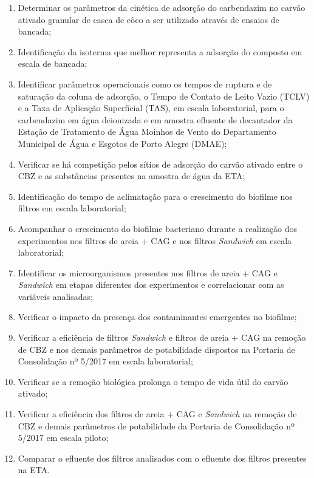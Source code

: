 \documentclass[
]{article}
\providecommand{\tightlist}{%
  \setlength{\itemsep}{0pt}\setlength{\parskip}{0pt}}
\begin{document}
\begin{enumerate}
\def\labelenumi{\alph{enumi})}
\tightlist
\item
  Determinar os parâmetros da cinética de adsorção do carbendazim no
  carvão ativado granular de casca de côco a ser utilizado através de
  ensaios de bancada;
\item
  Identificação da isoterma que melhor representa a adsorção do composto
  em escala de bancada;
\item
  Identificar parâmetros operacionais como os tempos de ruptura e de
  saturação da coluna de adsorção, o Tempo de Contato de Leito Vazio
  (TCLV) e a Taxa de Aplicação Superficial (TAS), em escala
  laboratorial, para o carbendazim em água deionizada e em amostra
  efluente de decantador da Estação de Tratamento de Água Moinhos de
  Vento do Departamento Municipal de Água e Esgotos de Porto Alegre
  (DMAE);
\item
  Verificar se há competição pelos sítios de adsorção do carvão ativado
  entre o CBZ e as substâncias presentes na amostra de água da ETA;
\item
  Identificação do tempo de aclimatação para o crescimento do biofilme
  nos filtros em escala laboratorial;
\item
  Acompanhar o crescimento do biofilme bacteriano durante a realização
  dos experimentos nos filtros de areia + CAG e nos filtros
  \emph{Sandwich} em escala laboratorial;
\item
  Identificar os microorganismos presentes nos filtros de areia + CAG e
  \emph{Sandwich} em etapas diferentes dos experimentos e correlacionar
  com as variáveis analisadas;
\item
  Verificar o impacto da presença dos contaminantes emergentes no
  biofilme;
\item
  Verificar a eficiência de filtros \emph{Sandwich} e filtros de areia +
  CAG na remoção de CBZ e nos demais parâmetros de potabilidade
  dispostos na Portaria de Consolidação nº 5/2017 em escala
  laboratorial;
\item
  Verificar se a remoção biológica prolonga o tempo de vida útil do
  carvão ativado;
\item
  Verificar a eficiência dos filtros de areia + CAG e \emph{Sandwich} na
  remoção de CBZ e demais parâmetros de potabilidade da Portaria de
  Consolidação nº 5/2017 em escala piloto;
\item
  Comparar o efluente dos filtros analisados com o efluente dos filtros
  presentes na ETA.
\end{enumerate}
\end{document}
